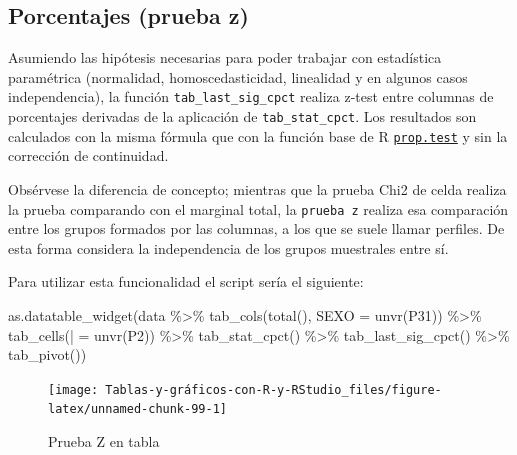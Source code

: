 \documentclass[
]{book}
\newenvironment{Shaded}{\begin{snugshade}}{\end{snugshade}}
\newcommand{\AttributeTok}[1]{\textcolor[rgb]{0.77,0.63,0.00}{#1}}
\newcommand{\FunctionTok}[1]{\textcolor[rgb]{0.00,0.00,0.00}{#1}}
\newcommand{\NormalTok}[1]{#1}
\newcommand{\OtherTok}[1]{\textcolor[rgb]{0.56,0.35,0.01}{#1}}
\newcommand{\SpecialCharTok}[1]{\textcolor[rgb]{0.00,0.00,0.00}{#1}}
\newcommand{\StringTok}[1]{\textcolor[rgb]{0.31,0.60,0.02}{#1}}
\begin{document}
\hypertarget{porcentajes-prueba-z}{%
\subsection{Porcentajes (prueba z)}\label{porcentajes-prueba-z}}

Asumiendo las hipótesis necesarias para poder trabajar con estadística paramétrica (normalidad, homoscedasticidad, linealidad y en algunos casos independencia), la función \texttt{tab\_last\_sig\_cpct} realiza z-test entre columnas de porcentajes derivadas de la aplicación de \texttt{tab\_stat\_cpct}. Los resultados son calculados con la misma fórmula que con la función base de R \href{https://www.rdocumentation.org/packages/stats/versions/3.6.2/topics/prop.test}{\texttt{prop.test}} y sin la corrección de continuidad.

Obsérvese la diferencia de concepto; mientras que la prueba Chi2 de celda realiza la prueba comparando con el marginal total, la \texttt{prueba\ z} realiza esa comparación entre los grupos formados por las columnas, a los que se suele llamar perfiles. De esta forma considera la independencia de los grupos muestrales entre sí.

Para utilizar esta funcionalidad el script sería el siguiente:

\begin{Shaded}
\begin{Highlighting}[]
\FunctionTok{as.datatable\_widget}\NormalTok{(data }\SpecialCharTok{\%\textgreater{}\%} \FunctionTok{tab\_cols}\NormalTok{(}\FunctionTok{total}\NormalTok{(), }\AttributeTok{SEXO =} \FunctionTok{unvr}\NormalTok{(P31)) }\SpecialCharTok{\%\textgreater{}\%} 
  \FunctionTok{tab\_cells}\NormalTok{(}\StringTok{\textasciigrave{}}\AttributeTok{|}\StringTok{\textasciigrave{}} \OtherTok{=} \FunctionTok{unvr}\NormalTok{(P2)) }\SpecialCharTok{\%\textgreater{}\%} \FunctionTok{tab\_stat\_cpct}\NormalTok{() }\SpecialCharTok{\%\textgreater{}\%} \FunctionTok{tab\_last\_sig\_cpct}\NormalTok{() }\SpecialCharTok{\%\textgreater{}\%} 
  \FunctionTok{tab\_pivot}\NormalTok{())}
\end{Highlighting}
\end{Shaded}

\begin{figure}[H]

{\centering \texttt{[image: Tablas-y-gráficos-con-R-y-RStudio\_files/figure-latex/unnamed-chunk-99-1]} 

}

\caption{Prueba Z en tabla}\label{fig:unnamed-chunk-99}
\end{figure}
\end{document}
